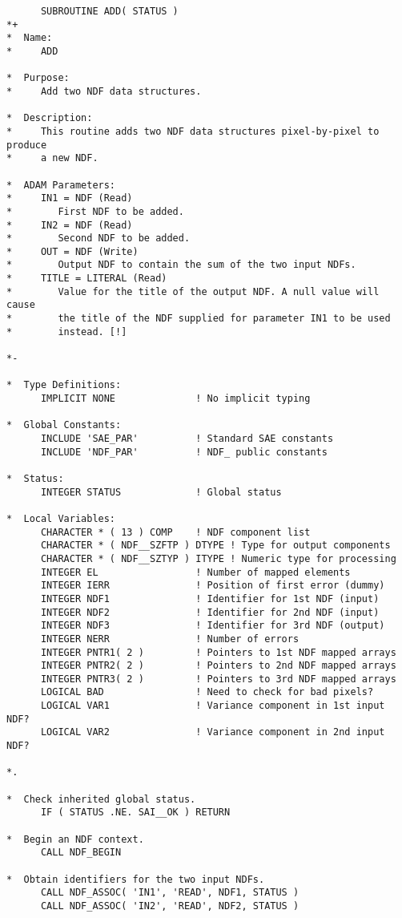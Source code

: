 \documentclass[twoside,11pt]{article}
\begin{document}
\small
\begin{verbatim}
      SUBROUTINE ADD( STATUS )
*+
*  Name:
*     ADD

*  Purpose:
*     Add two NDF data structures.

*  Description:
*     This routine adds two NDF data structures pixel-by-pixel to produce
*     a new NDF.

*  ADAM Parameters:
*     IN1 = NDF (Read)
*        First NDF to be added.
*     IN2 = NDF (Read)
*        Second NDF to be added.
*     OUT = NDF (Write)
*        Output NDF to contain the sum of the two input NDFs.
*     TITLE = LITERAL (Read)
*        Value for the title of the output NDF. A null value will cause
*        the title of the NDF supplied for parameter IN1 to be used
*        instead. [!]

*-
      
*  Type Definitions:
      IMPLICIT NONE              ! No implicit typing

*  Global Constants:
      INCLUDE 'SAE_PAR'          ! Standard SAE constants
      INCLUDE 'NDF_PAR'          ! NDF_ public constants

*  Status:
      INTEGER STATUS             ! Global status

*  Local Variables:
      CHARACTER * ( 13 ) COMP    ! NDF component list
      CHARACTER * ( NDF__SZFTP ) DTYPE ! Type for output components
      CHARACTER * ( NDF__SZTYP ) ITYPE ! Numeric type for processing
      INTEGER EL                 ! Number of mapped elements
      INTEGER IERR               ! Position of first error (dummy)
      INTEGER NDF1               ! Identifier for 1st NDF (input)
      INTEGER NDF2               ! Identifier for 2nd NDF (input)
      INTEGER NDF3               ! Identifier for 3rd NDF (output)
      INTEGER NERR               ! Number of errors
      INTEGER PNTR1( 2 )         ! Pointers to 1st NDF mapped arrays
      INTEGER PNTR2( 2 )         ! Pointers to 2nd NDF mapped arrays
      INTEGER PNTR3( 2 )         ! Pointers to 3rd NDF mapped arrays
      LOGICAL BAD                ! Need to check for bad pixels?
      LOGICAL VAR1               ! Variance component in 1st input NDF?
      LOGICAL VAR2               ! Variance component in 2nd input NDF?

*.

*  Check inherited global status.
      IF ( STATUS .NE. SAI__OK ) RETURN

*  Begin an NDF context.
      CALL NDF_BEGIN

*  Obtain identifiers for the two input NDFs.
      CALL NDF_ASSOC( 'IN1', 'READ', NDF1, STATUS )
      CALL NDF_ASSOC( 'IN2', 'READ', NDF2, STATUS )


\end{verbatim}
\end{document}
